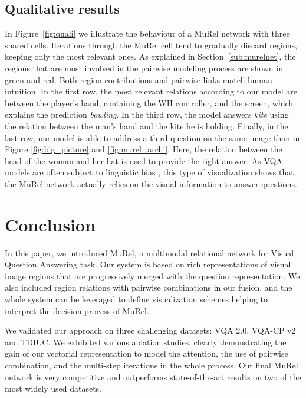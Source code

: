 \documentclass[10pt,twocolumn,letterpaper]{article}
\begin{document}
\subsection{Qualitative results}
In Figure~\ref{fig:quali} we illustrate the behaviour of a MuRel network with three shared cells.
Iterations through the MuRel cell tend to gradually discard regions, keeping only the most relevant ones. 
As explained in Section~\ref{sub:murelnet}, the regions that are most involved in the pairwise modeling process are shown in green and red.
Both region contributions and pairwise links match human intuition. In the first row, the most relevant relations according to our model are between the player's hand, containing the WII controller, and the screen, which explains the prediction \textit{bowling}. In the third row, the model answers \textit{kite} using the relation between the man's hand and the kite he is holding. Finally, in the last row, our model is able to address a third question on the same image than in Figure \ref{fig:big_picture} and \ref{fig:murel_archi}. Here, the relation between the head of the woman and her hat is used to provide the right answer. As VQA models are often subject to linguistic bias \cite{VQA2_Goyal_2017_CVPR,vqa-cp}, this type of visualization shows that the MuRel network actually relies on the visual information to answer questions.
 
\section{Conclusion}

In this paper, we introduced MuRel, a multimodal relational network for Visual Question Answering task. Our system is based on rich representations of visual image regions that are progressively merged with the question  representation.  We also included region relations with pairwise combinations in our fusion, and the whole system can be leveraged to define visualization schemes helping to interpret the decision process of MuRel.

We validated our approach on three challenging datasets: VQA 2.0, VQA-CP v2 and TDIUC.
We exhibited various ablation studies, clearly demonstrating the gain of our vectorial representation to model the attention, the use of pairwise combination, and the multi-step iterations in the whole process.  Our final MuRel network is very competitive and outperforms state-of-the-art results on two of the most widely used datasets.
\end{document}
